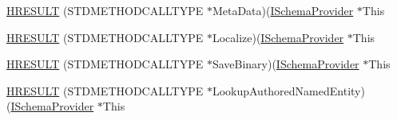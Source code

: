 \begin{DoxyCompactItemize}
\item 
\hyperlink{struct_i_schema_provider_vtbl_a7cf1046305a41411019924622c04f971}{H\+R\+E\+S\+U\+LT} (S\+T\+D\+M\+E\+T\+H\+O\+D\+C\+A\+L\+L\+T\+Y\+PE $\ast$Meta\+Data)(\hyperlink{structuredquery_8h_afffb1fb827b569b0b58a1ba88756a965}{I\+Schema\+Provider} $\ast$This
\item 
\hyperlink{struct_i_schema_provider_vtbl_ae8d5ad08dd0ee457298a080f6651b1b4}{H\+R\+E\+S\+U\+LT} (S\+T\+D\+M\+E\+T\+H\+O\+D\+C\+A\+L\+L\+T\+Y\+PE $\ast$Localize)(\hyperlink{structuredquery_8h_afffb1fb827b569b0b58a1ba88756a965}{I\+Schema\+Provider} $\ast$This
\item 
\hyperlink{struct_i_schema_provider_vtbl_a97fe86b1a859d5198379726e0bcce912}{H\+R\+E\+S\+U\+LT} (S\+T\+D\+M\+E\+T\+H\+O\+D\+C\+A\+L\+L\+T\+Y\+PE $\ast$Save\+Binary)(\hyperlink{structuredquery_8h_afffb1fb827b569b0b58a1ba88756a965}{I\+Schema\+Provider} $\ast$This
\item 
\hyperlink{struct_i_schema_provider_vtbl_afa51f78013174a2445c9e94b476bd088}{H\+R\+E\+S\+U\+LT} (S\+T\+D\+M\+E\+T\+H\+O\+D\+C\+A\+L\+L\+T\+Y\+PE $\ast$Lookup\+Authored\+Named\+Entity)(\hyperlink{structuredquery_8h_afffb1fb827b569b0b58a1ba88756a965}{I\+Schema\+Provider} $\ast$This
\end{DoxyCompactItemize}
